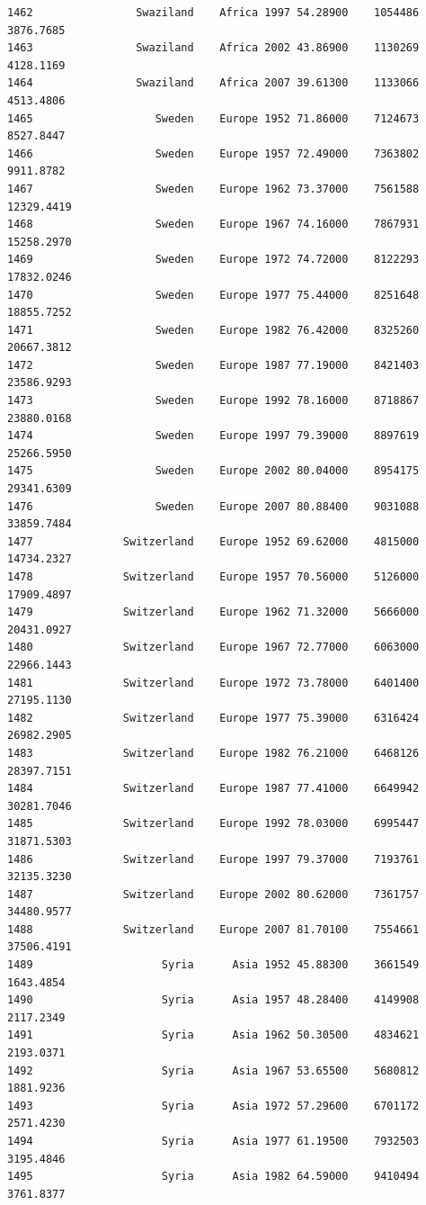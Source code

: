 \documentclass[
  letterpaper,
  DIV=11,
  numbers=noendperiod]{scrreprt}
\begin{document}
\begin{verbatim}
1462                Swaziland    Africa 1997 54.28900    1054486   3876.7685
1463                Swaziland    Africa 2002 43.86900    1130269   4128.1169
1464                Swaziland    Africa 2007 39.61300    1133066   4513.4806
1465                   Sweden    Europe 1952 71.86000    7124673   8527.8447
1466                   Sweden    Europe 1957 72.49000    7363802   9911.8782
1467                   Sweden    Europe 1962 73.37000    7561588  12329.4419
1468                   Sweden    Europe 1967 74.16000    7867931  15258.2970
1469                   Sweden    Europe 1972 74.72000    8122293  17832.0246
1470                   Sweden    Europe 1977 75.44000    8251648  18855.7252
1471                   Sweden    Europe 1982 76.42000    8325260  20667.3812
1472                   Sweden    Europe 1987 77.19000    8421403  23586.9293
1473                   Sweden    Europe 1992 78.16000    8718867  23880.0168
1474                   Sweden    Europe 1997 79.39000    8897619  25266.5950
1475                   Sweden    Europe 2002 80.04000    8954175  29341.6309
1476                   Sweden    Europe 2007 80.88400    9031088  33859.7484
1477              Switzerland    Europe 1952 69.62000    4815000  14734.2327
1478              Switzerland    Europe 1957 70.56000    5126000  17909.4897
1479              Switzerland    Europe 1962 71.32000    5666000  20431.0927
1480              Switzerland    Europe 1967 72.77000    6063000  22966.1443
1481              Switzerland    Europe 1972 73.78000    6401400  27195.1130
1482              Switzerland    Europe 1977 75.39000    6316424  26982.2905
1483              Switzerland    Europe 1982 76.21000    6468126  28397.7151
1484              Switzerland    Europe 1987 77.41000    6649942  30281.7046
1485              Switzerland    Europe 1992 78.03000    6995447  31871.5303
1486              Switzerland    Europe 1997 79.37000    7193761  32135.3230
1487              Switzerland    Europe 2002 80.62000    7361757  34480.9577
1488              Switzerland    Europe 2007 81.70100    7554661  37506.4191
1489                    Syria      Asia 1952 45.88300    3661549   1643.4854
1490                    Syria      Asia 1957 48.28400    4149908   2117.2349
1491                    Syria      Asia 1962 50.30500    4834621   2193.0371
1492                    Syria      Asia 1967 53.65500    5680812   1881.9236
1493                    Syria      Asia 1972 57.29600    6701172   2571.4230
1494                    Syria      Asia 1977 61.19500    7932503   3195.4846
1495                    Syria      Asia 1982 64.59000    9410494   3761.8377

\end{verbatim}
\end{document}

